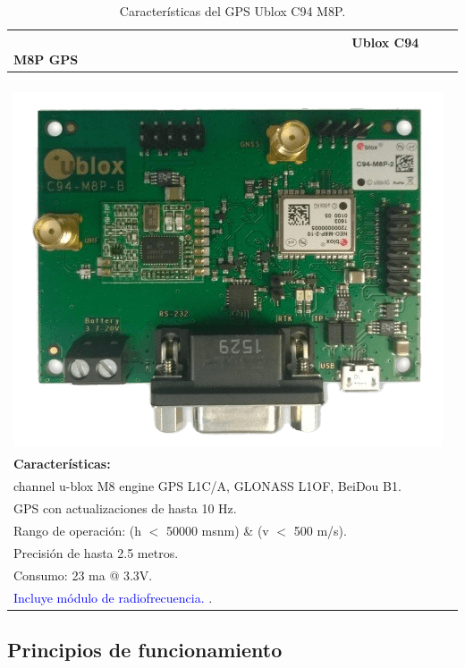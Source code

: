 \begin{table}[H]
\begin{center}
\caption{Características del GPS Ublox C94 M8P.}
\begin{tabular}{|l|}
	\hline
	\ \ \ \ \ \ \ \ \ \ \ \ \ \ \ \ \ \ \ \ \ \ \ \ \ \ \ \ \ \ \ \ \ \ \ \ \ \ \ \ \ \ \ \ \ \ \ \textbf{Ublox C94 M8P GPS}\\
	\hline
	      \ \ \ \ \ \ \ \ \ \ \ \ \ \ \ \ \ \ \ \ \ \ \ \ \ \ \ \ \ \ \ \ \ \ \ \ \ \ \ \ \ \ \ \ \ \ \ \includegraphics[width=0.25\linewidth]{Figures/ublox}\footnotemark
	\label{fig:ubx} \\
	\textbf{Características: }\\

		\tabitem 72 channel u-blox M8 engine GPS L1C/A, GLONASS L1OF, BeiDou B1.\\
		\tabitem GPS con actualizaciones de hasta 10 Hz.\\
		\tabitem Rango de operación: (h $<$ 50000 msnm) \& (v $<$ 500 m/s).\\
		\tabitem Precisión de hasta 2.5 metros.\\
		\tabitem Consumo: 23 ma @ 3.3V.\\
		\tabitem \textcolor{blue}{Incluye módulo de radiofrecuencia.} \citep{ubloxc94}.\\
	\hline
\end{tabular}
\end{center}
\end{table}


\FloatBarrier

\newpage

\subsection{Principios de funcionamiento}

